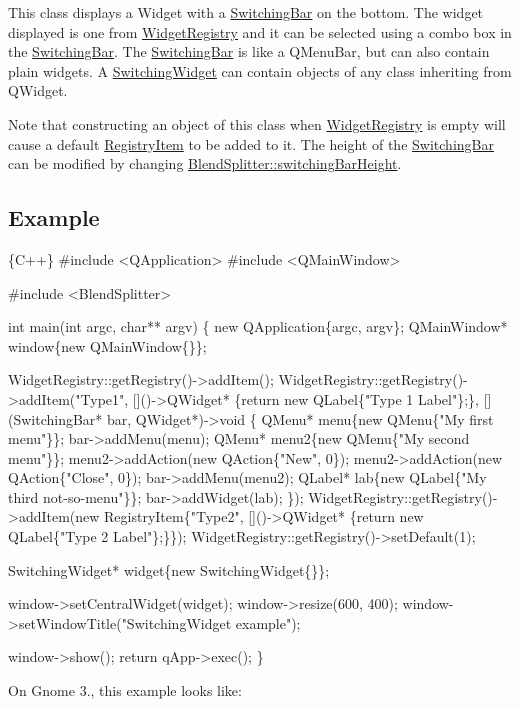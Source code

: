 This class displays a Widget with a \hyperlink{class_switching_bar}{Switching\+Bar} on the bottom. The widget displayed is one from \hyperlink{class_widget_registry}{Widget\+Registry} and it can be selected using a combo box in the \hyperlink{class_switching_bar}{Switching\+Bar}. The \hyperlink{class_switching_bar}{Switching\+Bar} is like a Q\+Menu\+Bar, but can also contain plain widgets. A \hyperlink{class_switching_widget}{Switching\+Widget} can contain objects of any class inheriting from Q\+Widget.

Note that constructing an object of this class when \hyperlink{class_widget_registry}{Widget\+Registry} is empty will cause a default \hyperlink{class_registry_item}{Registry\+Item} to be added to it. The height of the \hyperlink{class_switching_bar}{Switching\+Bar} can be modified by changing \hyperlink{class_blend_splitter_a478fa3cfcf59f76edf8f021bee297e0d}{Blend\+Splitter\+::switching\+Bar\+Height}.

\subsection*{Example }


\begin{DoxyCode}
\{C++\}
#include <QApplication>
#include <QMainWindow>

#include <BlendSplitter>

int main(int argc, char** argv)
\{
    new QApplication\{argc, argv\};
    QMainWindow* window\{new QMainWindow\{\}\};

    WidgetRegistry::getRegistry()->addItem();
    WidgetRegistry::getRegistry()->addItem("Type1", []()->QWidget* \{return new QLabel\{"Type 1 Label"\};\},
       [](SwitchingBar* bar, QWidget*)->void \{
        QMenu* menu\{new QMenu\{"My first menu"\}\};
        bar->addMenu(menu);
        QMenu* menu2\{new QMenu\{"My second menu"\}\};
        menu2->addAction(new QAction\{"New", 0\});
        menu2->addAction(new QAction\{"Close", 0\});
        bar->addMenu(menu2);
        QLabel* lab\{new QLabel\{"My third not-so-menu"\}\};
        bar->addWidget(lab);
    \});
    WidgetRegistry::getRegistry()->addItem(new RegistryItem\{"Type2", []()->QWidget* \{return new
       QLabel\{"Type 2 Label"\};\}\});
    WidgetRegistry::getRegistry()->setDefault(1);

    SwitchingWidget* widget\{new SwitchingWidget\{\}\};

    window->setCentralWidget(widget);
    window->resize(600, 400);
    window->setWindowTitle("SwitchingWidget example");

    window->show();
    return qApp->exec();
\}
\end{DoxyCode}
 On Gnome 3., this example looks like\+:


